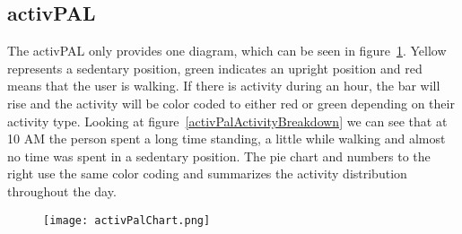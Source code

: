 \subsection{activPAL}
The activPAL only provides one diagram, which can be seen in figure~\ref{fig:activPalActivityBreakdown}. Yellow represents a sedentary position, green indicates an upright position and red means that the user is walking. If there is activity during an hour, the bar will rise and the activity will be color coded to either red or green depending on their activity type. Looking at figure~\ref{activPalActivityBreakdown} we can see that at 10 AM the person spent a long time standing, a little while walking and almost no time was spent in a sedentary position. The pie chart and numbers to the right use the same color coding and summarizes the activity distribution throughout the day.

\begin{figure}[h!]
	\centering
		\texttt{[image: activPalChart.png]}
		\caption{\footnotesize }
		\label{fig:activPalActivityBreakdown}
\end{figure}
